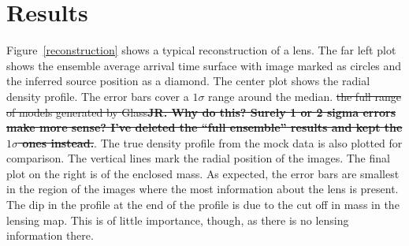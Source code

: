 \documentclass[galley,usenatbib]{mn2e}
\newcommand{\Glass}{{\sc Glass}}
\newcommand{\figref}[1] {Figure~\ref{#1}}
\begin{document}
\section{Results}\label{sec:results}
\figref{reconstruction} shows a typical reconstruction of a lens. The far left
plot shows the ensemble average arrival time surface with image marked as
circles and the inferred source position as a diamond. The center plot shows
the radial density profile. The error bars cover a $1\sigma$ range around the
median. \sout{the full range of models generated by \Glass {\bf JR. Why do
this? Surely 1 or 2 sigma errors make more sense? I've deleted the ``full
ensemble'' results and kept the $1\sigma$ ones instead.}}. The true density
profile from the mock data is also plotted for comparison. The vertical lines
mark the radial position of the images. The final plot on the right is of the
enclosed mass. As expected, the error bars are smallest in the region of the
images where the most information about the lens is present. The dip in the
profile at the end of the profile is due to the cut off in mass in the
lensing map. This is of little importance, though, as there is no lensing
information there.
\end{document}
